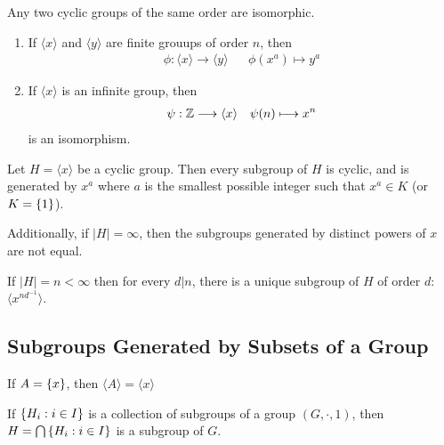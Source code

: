 \documentclass[a5paper]{article}
\begin{document}
\begin{theorem}
	Any two cyclic groups of the same order are isomorphic.
  \begin{enumerate}%
    \item If $\langle x \rangle$ and $\langle y \rangle$ are finite grouups of
      order $n$, then
      \begin{align*}
        \phi:\langle x \rangle\longrightarrow\langle y \rangle && \phi(x^a)\longmapsto y^a
      \end{align*}
    \item If $\langle x \rangle$ is an infinite group, then
      \begin{align*}
        \psi:\mathbb{Z}\longrightarrow\langle x \rangle && \psi(n)\longmapsto x^n
      \end{align*}
      is an isomorphism.
  \end{enumerate}
\end{theorem}

\begin{theorem}
	Let $H=\langle x \rangle$ be a cyclic group. Then every subgroup of $H$ is
  cyclic, and is generated by $x^a$ where $a$ is the smallest possible integer
  such that $x^a\in K$ (or $K=\left\{1\right\}$).

  Additionally, if $|H|=\infty$, then the subgroups generated by distinct powers
  of $x$ are not equal.

  If $|H|=n<\infty$ then for every $d|n$, there is a unique subgroup of $H$ of
  order $d$: $\langle x^{nd^{-1}} \rangle$.
\end{theorem}

\subsection{Subgroups Generated by Subsets of a Group}
\begin{example}
	If $A=\left\{x\right\}$, then $\langle A \rangle=\langle x \rangle$
\end{example}

\begin{lemma}
	If $\left\{H_i:i\in I\right\}$ is a collection of subgroups of a group
  $(G,\cdot,1)$, then $H=\mathop{\bigcap}\left\{H_i:i\in I\right\}$ is a subgroup of $G$.
\end{lemma}
\end{document}
